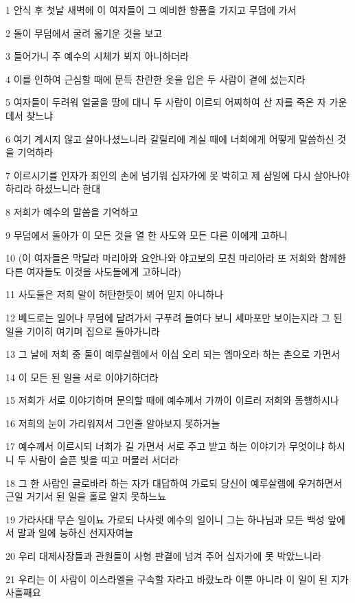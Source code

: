 \par 1 안식 후 첫날 새벽에 이 여자들이 그 예비한 향품을 가지고 무덤에 가서
\par 2 돌이 무덤에서 굴려 옮기운 것을 보고
\par 3 들어가니 주 예수의 시체가 뵈지 아니하더라
\par 4 이를 인하여 근심할 때에 문득 찬란한 옷을 입은 두 사람이 곁에 섰는지라
\par 5 여자들이 두려워 얼굴을 땅에 대니 두 사람이 이르되 어찌하여 산 자를 죽은 자 가운데서 찾느냐
\par 6 여기 계시지 않고 살아나셨느니라 갈릴리에 계실 때에 너희에게 어떻게 말씀하신 것을 기억하라
\par 7 이르시기를 인자가 죄인의 손에 넘기워 십자가에 못 박히고 제 삼일에 다시 살아나야 하리라 하셨느니라 한대
\par 8 저희가 예수의 말씀을 기억하고
\par 9 무덤에서 돌아가 이 모든 것을 열 한 사도와 모든 다른 이에게 고하니
\par 10 (이 여자들은 막달라 마리아와 요안나와 야고보의 모친 마리아라 또 저희와 함께한 다른 여자들도 이것을 사도들에게 고하니라)
\par 11 사도들은 저희 말이 허탄한듯이 뵈어 믿지 아니하나
\par 12 베드로는 일어나 무덤에 달려가서 구푸려 들여다 보니 세마포만 보이는지라 그 된 일을 기이히 여기며 집으로 돌아가니라
\par 13 그 날에 저희 중 둘이 예루살렘에서 이십 오리 되는 엠마오라 하는 촌으로 가면서
\par 14 이 모든 된 일을 서로 이야기하더라
\par 15 저희가 서로 이야기하며 문의할 때에 예수께서 가까이 이르러 저희와 동행하시나
\par 16 저희의 눈이 가리워져서 그인줄 알아보지 못하거늘
\par 17 예수께서 이르시되 너희가 길 가면서 서로 주고 받고 하는 이야기가 무엇이냐 하시니 두 사람이 슬픈 빛을 띠고 머물러 서더라
\par 18 그 한 사람인 글로바라 하는 자가 대답하여 가로되 당신이 예루살렘에 우거하면서 근일 거기서 된 일을 홀로 알지 못하느뇨
\par 19 가라사대 무슨 일이뇨 가로되 나사렛 예수의 일이니 그는 하나님과 모든 백성 앞에서 말과 일에 능하신 선지자여늘
\par 20 우리 대제사장들과 관원들이 사형 판결에 넘겨 주어 십자가에 못 박았느니라
\par 21 우리는 이 사람이 이스라엘을 구속할 자라고 바랐노라 이뿐 아니라 이 일이 된 지가 사흘째요
